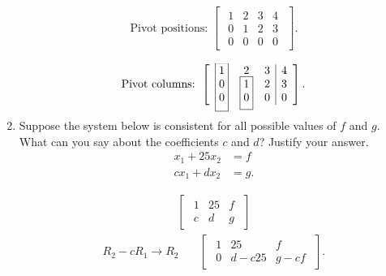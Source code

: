 \documentclass{zc-ust-hw}
\begin{document}
\begin{enumerate}
        \begin{align}
          \text{Pivot positions: }
          \begin{bmatrix} 
            \begin{array}{ccc|c}
              \boxed{1} & 2 & 3 & 4 \\
              0 & \boxed{1} & 2 & 3 \\
              0 & 0 & 0 & 0
            \end{array}
          \end{bmatrix}
        .\end{align}

        \begin{align}
          \text{Pivot columns: }
          \begin{bmatrix} 
            \begin{array}{ccc|c}
              \smash{\color{black}\fbox{\color{black}\rule[-30pt]{0pt}{1pt}$1$}} & 2 & 3 & 4 \\
              0 & \smash{\color{black}\fbox{\color{black}\rule[-16.5pt]{0pt}{1pt}$1$}} & 2 & 3 \\
              0 & 0 & 0 & 0
            \end{array}
          \end{bmatrix}
        .\end{align}

      \item Suppose the system below is consistent for all possible values of $f$
        and $g$. What can you say about the coefficients $c$ and $d$? Justify your
        answer.
        \begin{align*}
          x_1+25x_2&=f \\
          cx_1+dx_2&=g
        .\end{align*}

        \begin{align}
          \begin{bmatrix} 
            \begin{array}{cc|c}
              1 & 25 & f \\
              c & d & g
            \end{array}
          \end{bmatrix}
        \end{align}
        \begin{align}
          R_2-cR_1\rightarrow R_2
          & \quad
          \begin{bmatrix} 
            \begin{array}{cc|c}
              1 & 25 & f \\
              0 & d-c25 & g-cf
            \end{array}
          \end{bmatrix}
        .\end{align}


\end{enumerate}
\end{document}
